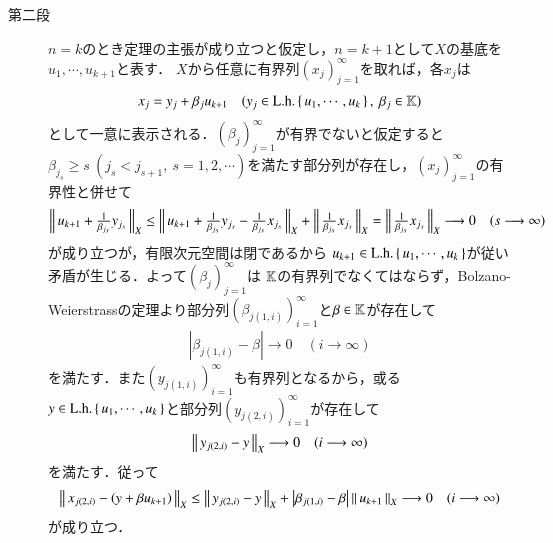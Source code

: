 \begin{prf}
\begin{description}
		\item[第二段]
			$n=k$のとき定理の主張が成り立つと仮定し，$n = k+1$として$X$の基底を$u_1,\cdots,u_{k+1}$と表す．
			$X$から任意に有界列$(x_j)_{j=1}^{\infty}$を取れば，各$x_j$は
			\begin{align}
				x_j = y_j + \beta_j u_{k+1} \quad (y_j \in \mathrm{L.h.} \left\{\, u_1,\cdots,u_k\, \right\},\ \beta_j \in \mathbb{K})
			\end{align}
			として一意に表示される．$(\beta_j)_{j=1}^{\infty}$が有界でないと仮定すると
			$\beta_{j_s} \geq s\ (j_s < j_{s+1},\ s=1,2,\cdots)$を満たす部分列が存在し，$(x_j)_{j=1}^{\infty}$の有界性と併せて
			\begin{align}
				\left\|\, u_{k+1} + \tfrac{1}{\beta_{j_s}}y_{j_s}\, \right\|_{X}
				\leq \left\|\, u_{k+1} + \tfrac{1}{\beta_{j_s}}y_{j_s} - \tfrac{1}{\beta_{j_s}}x_{j_s}\, \right\|_{X}
					+ \left\|\, \tfrac{1}{\beta_{j_s}}x_{j_s}\, \right\|_{X}
				= \left\|\, \tfrac{1}{\beta_{j_s}}x_{j_s}\, \right\|_{X} \longrightarrow 0 \quad (s \longrightarrow \infty)
			\end{align}
			が成り立つが，有限次元空間は閉であるから
			$u_{k+1} \in \mathrm{L.h.} \left\{\, u_1,\cdots,u_k\, \right\}$が従い矛盾が生じる．よって$(\beta_j)_{j=1}^{\infty}$は
			$\mathbb{K}$の有界列でなくてはならず，Bolzano-Weierstrassの定理より部分列$\left( \beta_{j(1,i)} \right)_{i=1}^{\infty}$と$\beta \in \mathbb{K}$が存在して
			\begin{align}
				\left| \beta_{j(1,i)} - \beta \right| \longrightarrow 0 \quad (i \longrightarrow \infty)
			\end{align}
			を満たす．また$\left(y_{j(1,i)}\right)_{i=1}^{\infty}$も有界列となるから，或る
			$y \in \mathrm{L.h.} \left\{\, u_1,\cdots,u_k\, \right\}$と部分列$\left(y_{j(2,i)}\right)_{i=1}^{\infty}$が存在して
			\begin{align}
				\left\|\, y_{j(2,i)} - y\, \right\|_{X} \longrightarrow 0 \quad (i \longrightarrow \infty)
			\end{align}
			を満たす．従って
			\begin{align}
				\left\|\, x_{j(2,i)} - \left(y + \beta u_{k+1}\right)\, \right\|_{X} \leq
				\left\|\, y_{j(2,i)} - y\, \right\|_{X} + \left| \beta_{j(1,i)} - \beta \right| \left\|\, u_{k+1}\, \right\|_{X}
				\longrightarrow 0 \quad (i \longrightarrow \infty)
			\end{align}
			が成り立つ．
			\QED
	\end{description}
\end{prf}